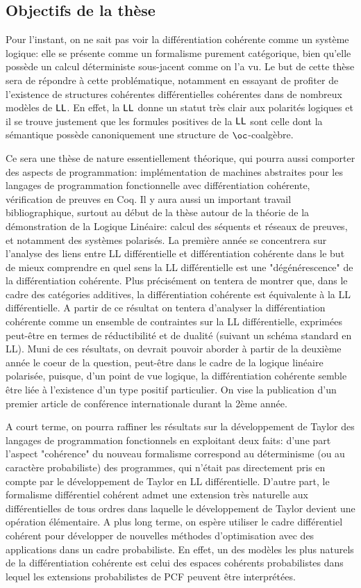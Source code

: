 \documentclass[a4]{article}
\begin{document}
\subsection*{Objectifs de la thèse}
Pour l'instant, on ne sait pas voir la différentiation cohérente comme
un système logique: elle se présente comme un formalisme purement
catégorique, bien qu'elle possède un calcul déterministe sous-jacent
comme on l'a vu.
%
Le but de cette thèse sera de répondre à cette problématique,
notamment en essayant de profiter de l'existence de structures
cohérentes différentielles cohérentes dans de nombreux modèles de
$\hbox{\textsf{LL}}$.
%
En effet, la $\hbox{\textsf{LL}}$ donne un statut très clair aux polarités logiques
et il se trouve justement que les formules positives de la $\hbox{\textsf{LL}}$ sont
celle dont la sémantique possède canoniquement une structure de
$\oc$-coalgèbre.

Ce sera une thèse de nature essentiellement théorique, qui pourra aussi comporter des aspects de programmation: implémentation de machines abstraites pour les langages de programmation fonctionnelle avec différentiation cohérente, vérification de preuves en Coq. Il y aura aussi un important travail bibliographique, surtout au début de la thèse autour de la théorie de la démonstration de la Logique Linéaire: calcul des séquents et réseaux de preuves, et notamment des systèmes polarisés. La première année se concentrera sur l'analyse des liens entre LL différentielle et différentiation cohérente dans le but de mieux comprendre en quel sens la LL différentielle est une "dégénérescence" de la différentiation cohérente. Plus précisément on tentera de montrer que, dans le cadre des catégories additives, la différentiation cohérente est équivalente à la LL différentielle. A partir de ce résultat on tentera d'analyser la différentiation cohérente comme un ensemble de contraintes sur la LL différentielle, exprimées peut-être en termes de réductibilité et de dualité (suivant un schéma standard en LL). Muni de ces résultats, on devrait pouvoir aborder à partir de la deuxième année le coeur de la question, peut-être dans le cadre de la logique linéaire polarisée, puisque, d'un point de vue logique, la différentiation cohérente semble être liée à l'existence d'un type positif particulier. On vise la publication d'un premier article de conférence internationale durant la 2ème année.

A court terme, on pourra raffiner les résultats sur la développement de Taylor des langages de programmation fonctionnels en exploitant deux faits: d'une part l'aspect "cohérence" du nouveau formalisme correspond au déterminisme (ou au caractère probabiliste) des programmes, qui n'était pas directement pris en compte par le développement de Taylor en LL différentielle. D'autre part, le formalisme différentiel cohérent admet une extension très naturelle aux différentielles de tous ordres dans laquelle le développement de Taylor devient une opération élémentaire. A plus long terme, on espère utiliser le cadre différentiel cohérent pour développer de nouvelles méthodes d'optimisation avec des applications dans un cadre probabiliste. En effet, un des modèles les plus naturels de la différentiation cohérente est celui des espaces cohérents probabilistes dans lequel les extensions probabilistes de PCF peuvent être interprétées.




\end{document}
